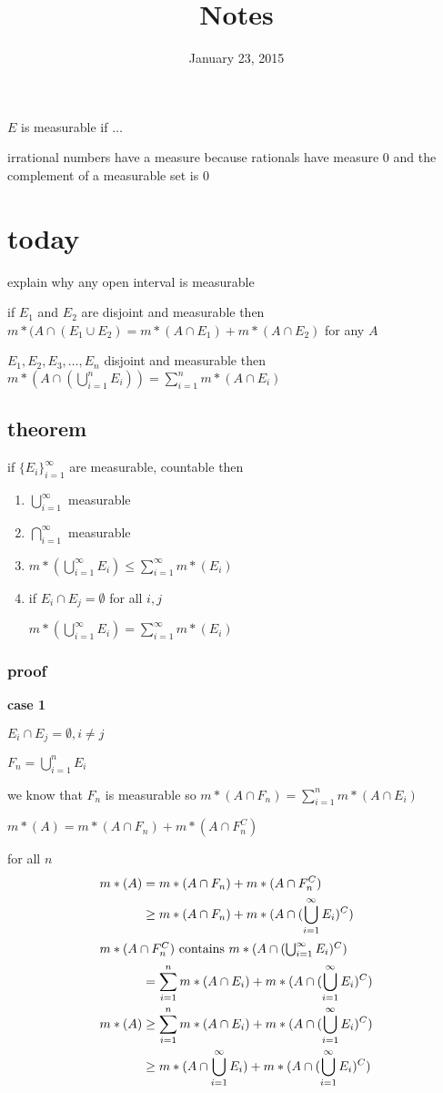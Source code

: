 \documentclass[letterpaper]{article}
\begin{document}
\title{Notes}
\date{January 23, 2015}
\maketitle
$E$ is measurable if $\dots$

irrational numbers have a measure because rationals have measure 0 and the complement of a measurable set is 0

\section*{today}
explain why any open interval is measurable

if $E_1$ and $E_2$ are disjoint and measurable then $m*(A\cap(E_1\cup E_2)=m*(A\cap E_1)+m*(A\cap E_2)$ for any $A$

$E_1,E_2,E_3,\dots,E_n$ disjoint and measurable then $m*(A\cap(\bigcup\limits_{i=1}^nE_i))=\sum\limits_{i=1}^n{m*(A\cap E_i)}$

\subsection*{theorem}
if $\{E_i\}_{i=1}^\infty$ are measurable, countable then
\begin{enumerate}
\item
$\bigcup\limits_{i=1}^\infty$ measurable
\item
$\bigcap\limits_{i=1}^\infty$ measurable
\item
$m*(\bigcup\limits_{i=1}^\infty E_i)\le\sum\limits_{i=1}^\infty{m*(E_i)}$
\item
if $E_i\cap E_j=\emptyset$ for all $i,j$

$m*(\bigcup\limits_{i=1}^\infty E_i)=\sum\limits_{i=1}^\infty{m*(E_i)}$
\end{enumerate}
\subsubsection*{proof}
{\bfseries case 1}

$E_i\cap E_j=\emptyset, i\ne j$

$F_n=\bigcup\limits_{i=1}^n E_i$

we know that $F_n$ is measurable so $m*(A\cap F_n)=\sum\limits_{i=1}^n{m*(A\cap E_i)}$

$m*(A)=m*(A\cap F_n)+m*(A\cap F_n^C)$


for all $n$
\begin{align*}
  m*(A)&=m*(A\cap F_n)+m*(A\cap F_n^C)\\
  &\ge m*(A\cap F_n)+m*(A\cap(\bigcup_{i=1}^\infty E_i)^C)\\
\intertext{$m*(A\cap F_n^C)$ contains $m*(A\cap(\bigcup_{i=1}^\infty E_i)^C)$}
  &= \sum\limits_{i=1}^n{m*(A\cap E_i)}+m*(A\cap(\bigcup_{i=1}^\infty E_i)^C)\\
  m*(A)&\ge \sum\limits_{i=1}^n{m*(A\cap E_i)}+m*(A\cap(\bigcup_{i=1}^\infty E_i)^C)\\
  &\ge m*(A\cap \bigcup_{i=1}^\infty E_i)+m*(A\cap(\bigcup_{i=1}^\infty E_i)^C)
\end{align*}
\end{document}
